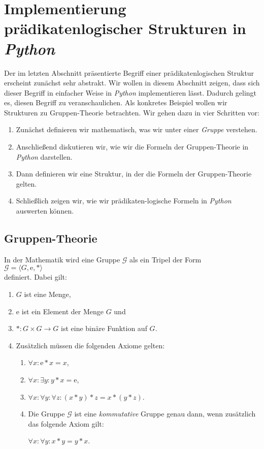 \section{Implementierung prädikatenlogischer Strukturen in \textsl{Python}}
Der im letzten Abschnitt präsentierte Begriff einer prädikatenlogischen Struktur erscheint zunächst
sehr abstrakt.  Wir wollen in diesem Abschnitt zeigen, dass sich dieser Begriff in einfacher Weise in
\textsl{Python} implementieren lässt.  Dadurch gelingt es, diesen Begriff zu veranschaulichen.  Als konkretes
Beispiel wollen wir Strukturen zu Gruppen-Theorie betrachten.  Wir gehen dazu in vier Schritten vor:
\begin{enumerate}
\item Zunächst definieren wir mathematisch, was wir unter einer \emph{Gruppe} verstehen.
\item Anschließend diskutieren wir, wie wir die Formeln der Gruppen-Theorie in \textsl{Python} darstellen.
\item Dann definieren wir eine Struktur, in der die Formeln der Gruppen-Theorie gelten.
\item Schließlich zeigen wir, wie wir prädikaten-logische Formeln in \textsl{Python} auswerten können.
\end{enumerate}

\subsection{Gruppen-Theorie}
In der Mathematik wird eine Gruppe $\mathcal{G}$ als ein Tripel der Form
\\[0.2cm]
\hspace*{1.3cm}
$\mathcal{G} = \langle G, \mathrm{e}, * \rangle$
\\[0.2cm]
definiert.  Dabei gilt:
\begin{enumerate}
\item $G$ ist eine Menge,
\item $\mathrm{e}$ ist ein Element der Menge $G$ und
\item $*:G \times G \rightarrow G$ ist eine binäre Funktion auf $G$.
\item Zusätzlich müssen die folgenden Axiome gelten:
      \begin{enumerate}
      \item $\forall x: \mathrm{e} * x = x$,
      \item $\forall x: \exists{y}: y * x = \mathrm{e}$,
      \item $\forall x: \forall y: \forall z: (x * y) * z = x * (y * z)$.
      \item Die Gruppe $\mathcal{G}$ ist eine \emph{kommutative} Gruppe genau dann, wenn zusätzlich das folgende Axiom gilt:
        
            $\forall x: \forall y: x * y = y * x$.
      \end{enumerate}
\end{enumerate}

